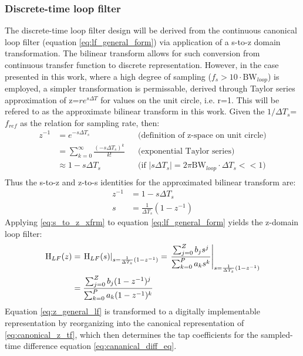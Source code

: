 \subsubsection{Discrete-time loop filter}\label{lf-discretization}
	The discrete-time loop filter design will be derived from the continuous canonical loop filter (equation \ref{eq:lf_general_form}) via application of a s-to-z domain transformation. The bilinear transform \cite{proakis_1993_bilinear} allows for such conversion from continuous transfer function to discrete representation. However, in the case presented in this work, where a high degree of sampling ($f_s > 10\cdot\mathrm{BW}_{loop}$) is employed, a simpler transformation is permissable, derived through Taylor series approximation of z=$re^{s\Delta T}$ for values on the unit circle, i.e. r=1. This will be refered to as the approximate bilinear transform in this work. Given the $1/\Delta T_s$=$f_{ref}$ as the relation for sampling rate, then:
	\begin{align*}
		z^{-1} &= e^{-s\Delta T_s} && \text{(definition of z-space on unit circle)} \\
		&= \sum_{k=0}^\infty\frac{(-s\Delta T_s)^k}{k!} && \text{(exponential Taylor series)} \\
		&\approx 1-s\Delta T_s &&\text{(if $|s\Delta T_s| = 2\pi\mathrm{BW}_{loop}\cdot \Delta T_s << 1$)} \\
	\end{align*}
	Thus the s-to-z and z-to-s identities for the approximated bilinear transform are:
	\begin{align}
		z^{-1} &= 1-s\Delta T_s\\
		s &= \frac{1}{\Delta T_s}(1-z^{-1}) \label{eq:s_to_z_xfrm}
	\end{align}
	Applying \ref{eq:s_to_z_xfrm} to equation \ref{eq:lf_general_form} yields the z-domain loop filter:
	\begin{align}
		\textnormal{H}_{LF}(z) &= \left.\textnormal{H}_{LF}(s)\right\vert_{s=\frac{1}{\Delta T_s}(1-z^{-1})} = \left.\frac{\sum_{j=0}^Z b_js^j}{\sum_{k=0}^P a_ks^k}\right\vert_{s=\frac{1}{\Delta T_s}(1-z^{-1})}\\
		&= \frac{\sum_{j=0}^Z b_j(1-z^{-1})^j}{\sum_{k=0}^P a_k(1-z^{-1})^k} \label{eq:z_general_lf}
	\end{align}
	Equation \ref{eq:z_general_lf} is transformed to a digitally implementable representation by reorganizing into the canonical representation of \ref{eq:canonical_z_tf}, which then determines the tap coefficients for the sampled-time difference equation \ref{eq:cananical_diff_eq}. 
